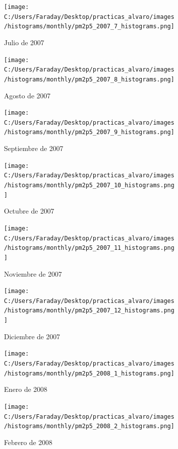 \documentclass[12pt]{article}
\begin{document}
\newpage

\begin{figure}[H]
\centering
\begin{subfigure}[h]{0.45\textwidth}
\texttt{[image: C:/Users/Faraday/Desktop/practicas\_alvaro/images/histograms/monthly/pm2p5\_2007\_7\_histograms.png]}
\caption{Julio de 2007}
\label{fig:hist-mon-4-7-2007}
\end{subfigure}
%
\begin{subfigure}[H]{0.45\textwidth}
\texttt{[image: C:/Users/Faraday/Desktop/practicas\_alvaro/images/histograms/monthly/pm2p5\_2007\_8\_histograms.png]}
\caption{Agosto de 2007}
\label{fig:hist-mon-4-8-2007}
\end{subfigure}
\caption{}
\end{figure}

\begin{figure}[H]
\centering
\begin{subfigure}[h]{0.45\textwidth}
\texttt{[image: C:/Users/Faraday/Desktop/practicas\_alvaro/images/histograms/monthly/pm2p5\_2007\_9\_histograms.png]}
\caption{Septiembre de 2007}
\label{fig:hist-mon-4-9-2007}
\end{subfigure}
%
\begin{subfigure}[H]{0.45\textwidth}
\texttt{[image: C:/Users/Faraday/Desktop/practicas\_alvaro/images/histograms/monthly/pm2p5\_2007\_10\_histograms.png]}
\caption{Octubre de 2007}
\label{fig:hist-mon-4-10-2007}
\end{subfigure}
\caption{}
\end{figure}

\begin{figure}[H]
\centering
\begin{subfigure}[h]{0.45\textwidth}
\texttt{[image: C:/Users/Faraday/Desktop/practicas\_alvaro/images/histograms/monthly/pm2p5\_2007\_11\_histograms.png]}
\caption{Noviembre de 2007}
\label{fig:hist-mon-4-11-2007}
\end{subfigure}
%
\begin{subfigure}[H]{0.45\textwidth}
\texttt{[image: C:/Users/Faraday/Desktop/practicas\_alvaro/images/histograms/monthly/pm2p5\_2007\_12\_histograms.png]}
\caption{Diciembre de 2007}
\label{fig:hist-mon-4-12-2007}
\end{subfigure}
\caption{}
\end{figure}

\newpage

\begin{figure}[H]
\centering
\begin{subfigure}[h]{0.45\textwidth}
\texttt{[image: C:/Users/Faraday/Desktop/practicas\_alvaro/images/histograms/monthly/pm2p5\_2008\_1\_histograms.png]}
\caption{Enero de 2008}
\label{fig:hist-mon-4-1-2008}
\end{subfigure}
%
\begin{subfigure}[H]{0.45\textwidth}
\texttt{[image: C:/Users/Faraday/Desktop/practicas\_alvaro/images/histograms/monthly/pm2p5\_2008\_2\_histograms.png]}
\caption{Febrero de 2008}
\label{fig:hist-mon-4-2-2008}
\end{subfigure}
\caption{}
\end{figure}
\end{document}

